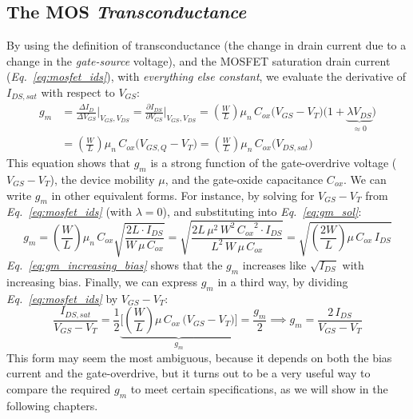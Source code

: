 \subsection{The MOS \textit{Transconductance}}
By using the definition of transconductance (the change in drain current due to a change in the \textit{gate-source} voltage), and the MOSFET saturation drain current (\emph{Eq.~\ref{eq:mosfet_ids}}), with \textit{everything else constant}, we evaluate the derivative of $I_{DS,sat}$ with respect to $V_{GS}$:
    \begin{align}
        g_m &= \frac{\Delta I_D}{\Delta V_{GS}} \bigg\rvert_{V_{GS},V_{DS}}
        = \frac{\partial I_{DS}}{\partial V_{GS}} \bigg\rvert_{V_{GS},V_{DS}}
        = \left( \frac{W}{L} \right) \mu_n\,C_{ox} \big(V_{GS} - V_T)(1 +\underbrace{\lambda V_{DS}}_{\approx 0}\big)\\[0.25cm]
        &= \left( \frac{W}{L} \right) \mu_n\,C_{ox} \big(V_{GS,Q} - V_T)
        = \left( \frac{W}{L} \right) \mu_n\,C_{ox} \big(V_{DS,sat}\big)
        \label{eq:gm_sol}
    \end{align}
This equation shows that $g_m$ is a strong function of the gate-overdrive voltage ($V_{GS} - V_T$), the device mobility $\mu$, and the gate-oxide capacitance $C_{ox}$.  We can write $g_m$ in other equivalent forms.  For instance, by solving for $V_{GS}-V_T$ from \emph{Eq.~\ref{eq:mosfet_ids}} (with $\lambda = 0$), and substituting into \emph{Eq.~\ref{eq:gm_sol}}:
    \begin{equation}
        g_m = \left( \frac{W}{L} \right) \mu_n\,C_{ox} \sqrt{\frac{2L\cdot I_{DS}}{W\,\mu\,C_{ox}}}
        = \sqrt{\frac{2L\,\mu^2\,W^2\,{C_{ox}}^2\cdot I_{DS}}{L^2\,W\,\mu\,C_{ox}}}
        = \boxed{ \sqrt{\left( \frac{2W}{L} \right)\mu\,C_{ox}\,I_{DS}} }
        \label{eq:gm_increasing_bias}
    \end{equation}
\emph{Eq.~\ref{eq:gm_increasing_bias}} shows that the $g_m$ increases like $\sqrt{I_{DS}}$ with increasing bias.  Finally, we can express $g_m$ in a third way, by dividing \emph{Eq.~\ref{eq:mosfet_ids}} by $V_{GS}-V_T$:
    \begin{equation}
        \frac{I_{DS,sat}}{V_{GS} - V_T} =
            \frac{1}{2} \underbrace{\bigg[ \left( \frac{W}{L} \right) \mu\,C_{ox}\,\big(V_{GS} - V_T\big) \bigg]}_{g_m} = \frac{g_m}{2}
            \implies \boxed{g_m = \frac{2\,I_{DS}}{V_{GS} - V_T}}
            \label{eq:gm_vstar}
    \end{equation} 
This form may seem the most ambiguous, because it depends on both the bias current and the gate-overdrive, but it turns out to be a very useful way to compare the required $g_m$ to meet certain specifications, as we will show in the following chapters.
